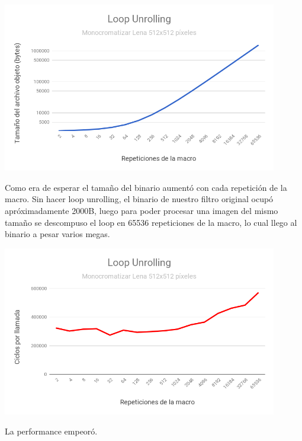 \begin{center}

	\includegraphics[width=0.9\textwidth]{imagenes/loopunrolling/size.png}

\end{center}

Como era de esperar el tamaño del binario aumentó con cada repetición de la macro. Sin hacer loop unrolling, el binario de nuestro filtro original ocupó apróximadamente 2000B, luego para poder procesar una imagen del mismo tamaño se descompuso el loop en 65536 repeticiones de la macro, lo cual llego al binario a pesar varios megas.

\begin{center}

	\includegraphics[width=0.9\textwidth]{imagenes/loopunrolling/time.png}

\end{center}

La performance empeoró.


